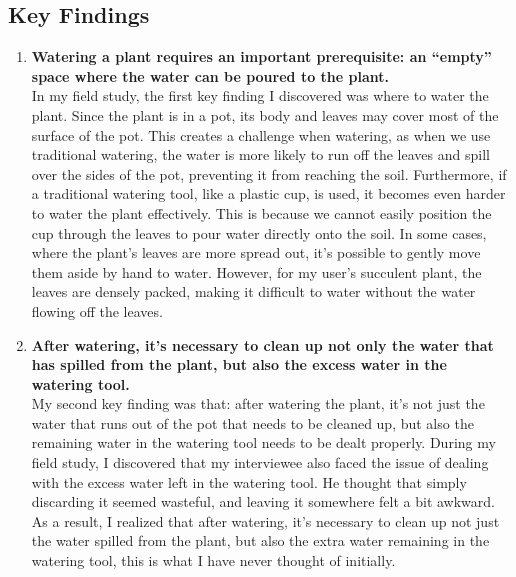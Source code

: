 \documentclass[math,code]{amznotes}
\theoremstyle{remark}
\begin{document}
\subsection{Key Findings}
\begin{enumerate}
    \item \textbf{Watering a plant requires an important prerequisite: an ``empty'' space where the water can be poured to the plant.} \\
    In my field study, the first key finding I discovered was where to water the plant. Since the plant is in a pot, its body and leaves may cover most of the surface of the pot. This creates a challenge when watering, as when we use traditional watering, the water is more likely to run off the leaves and spill over the sides of the pot, preventing it from reaching the soil. Furthermore, if a traditional watering tool, like a plastic cup, is used, it becomes even harder to water the plant effectively. This is because we cannot easily position the cup through the leaves to pour water directly onto the soil. In some cases, where the plant’s leaves are more spread out, it’s possible to gently move them aside by hand to water. However, for my user’s succulent plant, the leaves are densely packed, making it difficult to water without the water flowing off the leaves.
    \item \textbf{After watering, it's necessary to clean up not only the water that has spilled from the plant, but also the excess water in the watering tool.} \\
    My second key finding was that: after watering the plant, it's not just the water that runs out of the pot that needs to be cleaned up, but also the remaining water in the watering tool needs to be dealt properly. During my field study, I discovered that my interviewee also faced the issue of dealing with the excess water left in the watering tool. He thought that simply discarding it seemed wasteful, and leaving it somewhere felt a bit awkward. As a result, I realized that after watering, it’s necessary to clean up not just the water spilled from the plant, but also the extra water remaining in the watering tool, this is what I have never thought of initially.
\end{enumerate}
\end{document}
